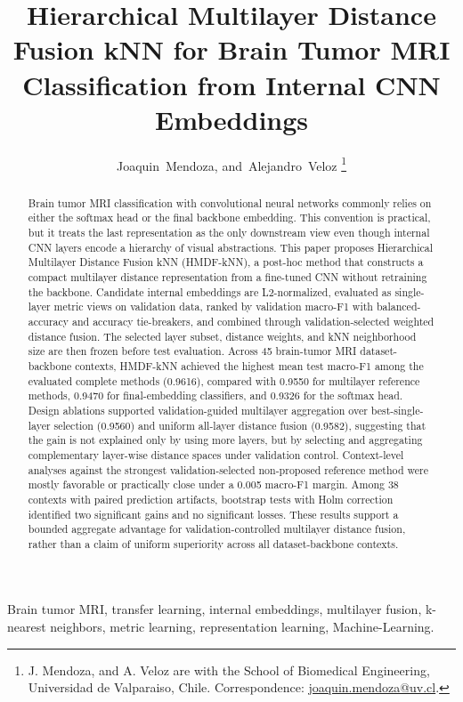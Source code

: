 \documentclass[journal]{IEEEtran}
\title{Hierarchical Multilayer Distance Fusion kNN for Brain Tumor MRI Classification from Internal CNN Embeddings}
\author{
  Joaquin~Mendoza,
  and~Alejandro~Veloz%
  \thanks{J. Mendoza, and A. Veloz are with the School of Biomedical Engineering, Universidad de Valparaiso, Chile. Correspondence: \href{mailto:joaquin.mendoza@uv.cl}{joaquin.mendoza@uv.cl}.}
}
\newcommand{\method}{HMDF-kNN}
\newcommand{\fullmethod}{Hierarchical Multilayer Distance Fusion kNN}
\begin{document}
\maketitle

\begin{abstract}
Brain tumor MRI classification with convolutional neural networks commonly relies on either the softmax head or the final backbone embedding. This convention is practical, but it treats the last representation as the only downstream view even though internal CNN layers encode a hierarchy of visual abstractions. This paper proposes \fullmethod{} (\method{}), a post-hoc method that constructs a compact multilayer distance representation from a fine-tuned CNN without retraining the backbone. Candidate internal embeddings are L2-normalized, evaluated as single-layer metric views on validation data, ranked by validation macro-F1 with balanced-accuracy and accuracy tie-breakers, and combined through validation-selected weighted distance fusion. The selected layer subset, distance weights, and kNN neighborhood size are then frozen before test evaluation. Across 45 brain-tumor MRI dataset-backbone contexts, \method{} achieved the highest mean test macro-F1 among the evaluated complete methods (0.9616), compared with 0.9550 for multilayer reference methods, 0.9470 for final-embedding classifiers, and 0.9326 for the softmax head. Design ablations supported validation-guided multilayer aggregation over best-single-layer selection (0.9560) and uniform all-layer distance fusion (0.9582), suggesting that the gain is not explained only by using more layers, but by selecting and aggregating complementary layer-wise distance spaces under validation control. Context-level analyses against the strongest validation-selected non-proposed reference method were mostly favorable or practically close under a 0.005 macro-F1 margin. Among 38 contexts with paired prediction artifacts, bootstrap tests with Holm correction identified two significant gains and no significant losses. These results support a bounded aggregate advantage for validation-controlled multilayer distance fusion, rather than a claim of uniform superiority across all dataset-backbone contexts.
\end{abstract}


\begin{IEEEkeywords}
Brain tumor MRI, transfer learning, internal embeddings, multilayer fusion, k-nearest neighbors, metric learning, representation learning, Machine-Learning.
\end{IEEEkeywords}

\IEEEpeerreviewmaketitle









\ifCLASSOPTIONcaptionsoff
  \newpage
\fi




\vfill
\end{document}
